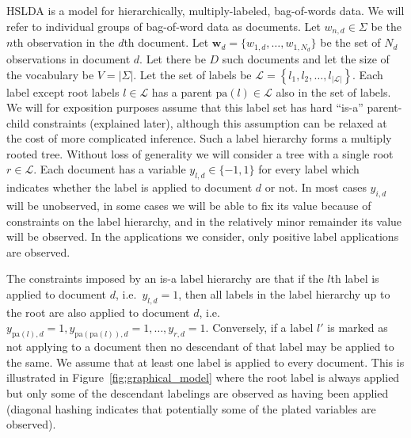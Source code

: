 
\label{sec:model} 

HSLDA is a model for hierarchically, multiply-labeled, bag-of-words data.  We will refer to individual groups of bag-of-word data as documents.  Let $w_{n,d} \in \Sigma$ be the $n$th observation in the $d$th document.  Let $\mathbf{w}_d = \{w_{1,d},\ldots,w_{1,N_d}\}$ be the  set of $N_d$ observations in document $d$.  Let there be $D$ such documents and let the size of the vocabulary be $V=|\Sigma|$.  Let the set of labels be $\mathcal{L}=\left\{ l_{1},l_{2},\ldots,l_{\left|\mathcal{L}\right|}\right\} $. Each label except root labels $l \in \mathcal{L}$ has a parent $\mathrm{pa}(l) \in \mathcal{L}$ also in the set of labels.
 We will for exposition purposes assume that this label set has hard ``is-a'' parent-child constraints (explained later), although this assumption can be relaxed at the cost of more complicated inference.  Such a label hierarchy forms a multiply rooted tree.  Without loss of generality we will consider a tree with a single root $r\in\mathcal{L}$.  Each document has a variable $y_{l,d} \in \{-1,1\}$ for every label which indicates whether the label is applied to document $d$ or not.   In most cases $y_{i,d}$ will be unobserved, in some cases we will be able to fix its value because of  constraints on the label hierarchy, and in the relatively minor remainder its value will be observed.  In the applications we consider, only positive label applications are observed.  
 
The constraints imposed by an is-a label hierarchy are that if the $l$th label is applied to document $d$, i.e.~$y_{l,d} = 1$, then all labels in the label hierarchy up to the root are also applied to document $d$, i.e.~$y_{\mathrm{pa}(l),d} = 1, y_{\mathrm{pa}(\mathrm{pa}(l)),d} = 1, \ldots, y_{r,d}=1.$  Conversely, if a label $l'$ is marked as not applying to a document then no descendant of that label may be applied to the same.   We assume that at least one label is applied to every document.  This is illustrated in Figure~\ref{fig:graphical_model} where the root label is always applied but only some of the descendant labelings are observed as having been applied (diagonal hashing indicates that potentially some of the plated variables are observed).

